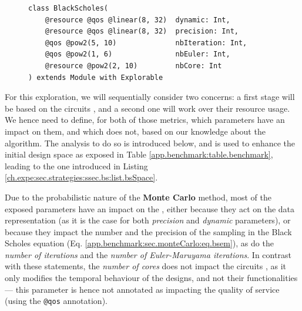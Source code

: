                 \begin{figure}[ht!]
                    \begin{lstlisting}[xleftmargin=0mm,
                                       caption={[Expertise-based design space for Black Scholes meta design]Expertise-based design space for Black Scholes {\bf meta design}},
                                       label={ch.expe:sec.strategies:ssec.bs:list.bsSpace}]
class BlackScholes(
    @resource @qos @linear(8, 32)  dynamic: Int,
    @resource @qos @linear(8, 32)  precision: Int,
    @qos @pow2(5, 10)              nbIteration: Int,
    @qos @pow2(1, 6)               nbEuler: Int,
    @resource @pow2(2, 10)         nbCore: Int
) extends Module with Explorable\end{lstlisting}
                \vspace{-0.4cm}
                \end{figure}

                For this exploration, we will sequentially consider two concerns: a first stage will be based on the circuits , and a second one will work over their resource usage.
                We hence need to define, for both of those metrics, which parameters have an impact on them, and which does not, based on our knowledge about the algorithm.
                The analysis to do so is introduced below, and is used to enhance the initial design space as exposed in Table \ref{app.benchmark:table.benchmark}, leading to the one introduced in Listing \ref{ch.expe:sec.strategies:ssec.bs:list.bsSpace}.

                Due to the probabilistic nature of the {\bf Monte Carlo} method, most of the exposed parameters have an impact on the , either because they act on the data representation (as it is the case for both {\it precision} and {\it dynamic} parameters), or because they impact the number and the precision of the sampling in the Black Scholes equation (Eq. \ref{app.benchmark:sec.monteCarlo:eq.bsem}), as do the {\it number of iterations} and the {\it number of Euler-Maruyama iterations}.
                In contrast with these statements, the {\it number of cores} does not impact the circuits , as it only modifies the temporal behaviour of the designs, and not their functionalities --- this parameter is hence not annotated as impacting the quality of service (using the \lstinline{@qos} annotation).


